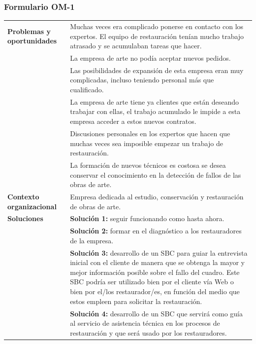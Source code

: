 \documentclass[a4paper,11pt]{article}
\begin{document}
			\subsubsection{Formulario OM-1}
			\begin{center}
				\begin{tabular}{| p{2.9cm} | p{8.5cm} |}
					\hline
					\textbf{Problemas y oportunidades} &
					Muchas veces era complicado ponerse en contacto con los expertos. El equipo
					de restauración tenían mucho trabajo atrasado y se acumulaban tareas que hacer.\\
					& La empresa de arte no podía aceptar nuevos pedidos.\\
					& Las posibilidades de expansión de esta empresa eran muy complicadas,
					incluso teniendo personal más que cualificado.\\
					& La empresa de arte tiene ya clientes que están deseando trabajar con
					ellas, el trabajo acumulado le impide a esta empresa acceder a estos nuevos
					contratos.\\
					& Discusiones personales en los expertos que hacen que muchas veces sea
					imposible empezar un trabajo de restauración.\\
					& La formación de nuevos técnicos es costosa se desea conservar el
					conocimiento en la detección de fallos de las obras de arte.\\
					\hline
					\textbf{Contexto organizacional} &
					Empresa dedicada al estudio, conservación y restauración de obras de arte.\\
					\hline
					\textbf{Soluciones} & \textbf{Solución 1:} seguir funcionando como hasta ahora.\\
					& \textbf{Solución 2:} formar en el diagnóstico a los restauradores de la empresa.\\
					& \textbf{Solución 3:} desarrollo de un SBC para guiar la entrevista inicial con el cliente de manera que se obtenga la mayor y mejor información posible sobre el fallo del cuadro. Este SBC podría ser utilizado bien por el cliente vía Web o bien por el/los restaurador/es, en función del medio que estos empleen para solicitar la restauración.\\
					& \textbf{Solución 4:} desarrollo de un SBC que servirá como guía al servicio de asistencia técnica en los procesos de restauración y que será usado por los restauradores.\\
					\hline
				\end{tabular}
			\end{center}
			\newpage
\end{document}
